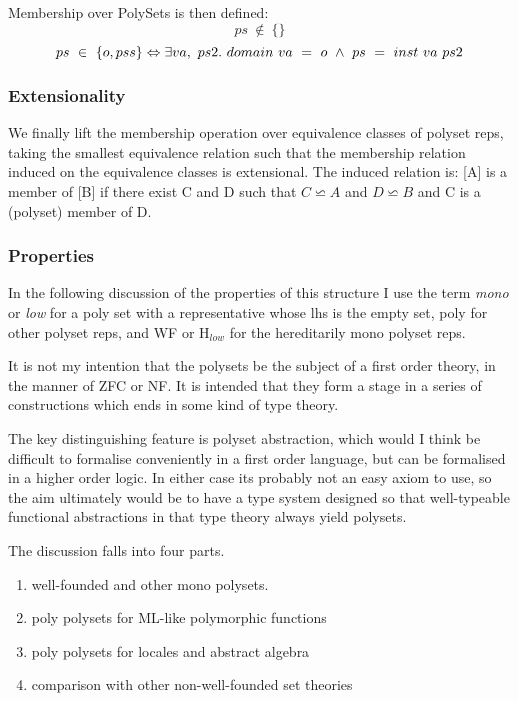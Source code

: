 \documentclass{article}
\begin{document}
\begin{article}
Membership over PolySets is then defined:
\begin{displaymath}
ps\ \not\in\ \{\}
\end{displaymath}
\begin{displaymath}
ps\ \in\ \{o,pss\}\\
\Leftrightarrow\\
\exists va,\ ps2.\ domain\ va\ =\ o\ \wedge\ ps\ =\ inst\ va\ ps2
\end{displaymath}

\subsubsection{Extensionality}

We finally lift the membership operation over equivalence classes of polyset reps, taking the smallest equivalence relation such that the membership relation induced on the equivalence classes is extensional.
The induced relation is: [A] is a member of [B] if there exist C and D such that $C \backsimeq A$ and $D \backsimeq B$ and C is a (polyset) member of D.

\subsubsection{Properties}

In the following discussion of the properties of this structure I use the term {\it mono} or {\it low} for a poly set with a representative whose lhs is the empty set, poly for other polyset reps, and WF or H$_{low}$ for the hereditarily mono polyset reps.

It is not my intention that the polysets be the subject of a first order theory, in the manner of ZFC or NF.
It is intended that they form a stage in a series of constructions which ends in some kind of type theory.

The key distinguishing feature is polyset abstraction, which would I think be difficult to formalise conveniently in a first order language, but can be formalised in a higher order logic.
In either case its probably not an easy axiom to use, so the aim ultimately would be to have a type system designed so that well-typeable functional abstractions in that type theory always yield polysets.

The discussion falls into four parts.
\begin{enumerate}
\item well-founded and other mono polysets.
\item poly polysets for ML-like polymorphic functions
\item poly polysets for locales and abstract algebra
\item comparison with other non-well-founded set theories
\end{enumerate}


\end{article}
\end{document}
